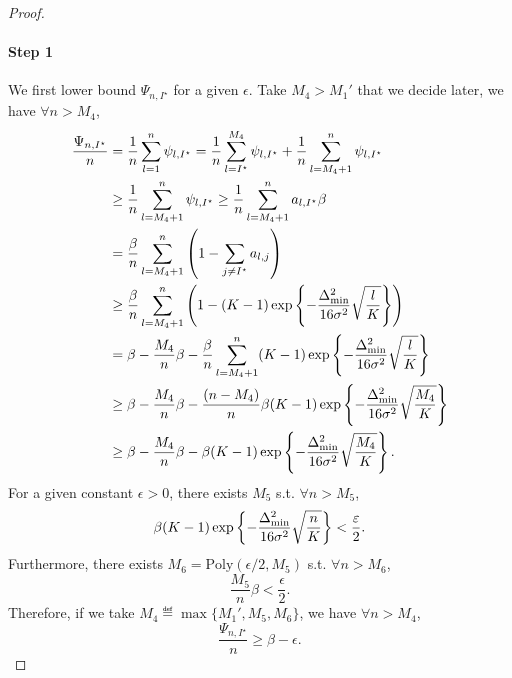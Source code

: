 \begin{proof}
    \paragraph{Step 1} We first lower bound $\Psi_{n,I^\star}$ for a given $\epsilon$. Take $M_4 > M_1'$ that we decide later, we have $\forall n > M_4$,
    \begin{align*}
        \frac{\Psi_{n,I^\star}}{n} &= \frac{1}{n}\sum_{l=1}^{n}\psi_{l,I^\star} = \frac{1}{n}\sum_{l=I^\star}^{M_4}\psi_{l,I^\star} + \frac{1}{n}\sum_{l=M_4+1}^{n}\psi_{l,I^\star}\\
                             &\geq \frac{1}{n}\sum_{l=M_4+1}^{n}\psi_{l,I^\star} \geq \frac{1}{n}\sum_{l=M_4+1}^{n} a_{l,I^\star}\beta\\
                             &= \frac{\beta}{n}\sum_{l=M_4+1}^{n} \left(1-\sum_{j\neq I^\star}a_{l,j}\right)\\
                             &\geq \frac{\beta}{n}\sum_{l=M_4+1}^{n} \left(1-(K-1)\exp\left\{-\frac{\Delta_{\text{min}}^2}{16\sigma^2}\sqrt{\frac{l}{K}}\right\}\right)\\
                             &= \beta - \frac{M_4}{n}\beta - \frac{\beta}{n}\sum_{l=M_4+1}^{n} (K-1)\exp\left\{-\frac{\Delta_{\text{min}}^2}{16\sigma^2}\sqrt{\frac{l}{K}}\right\}\\
                             &\geq \beta - \frac{M_4}{n}\beta - \frac{(n-M_4)}{n}\beta(K-1)\exp\left\{-\frac{\Delta_{\text{min}}^2}{16\sigma^2}\sqrt{\frac{M_4}{K}}\right\}\\
                             &\geq \beta - \frac{M_4}{n}\beta - \beta(K-1)\exp\left\{-\frac{\Delta_{\text{min}}^2}{16\sigma^2}\sqrt{\frac{M_4}{K}}\right\}.
    \end{align*}
    For a given constant $\epsilon>0$, there exists $M_5$ s.t. $\forall n > M_5$,
    \[
        \beta(K-1)\exp\left\{-\frac{\Delta_{\text{min}}^2}{16\sigma^2}\sqrt{\frac{n}{K}}\right\} < \frac{\varepsilon}{2}.
    \]
    Furthermore, there exists $M_6 = \text{Poly}(\epsilon/2,M_5)$ s.t. $\forall n > M_6$,
    \[
        \frac{M_5}{n}\beta < \frac{\epsilon}{2}.
    \]
    Therefore, if we take $M_4 \eqdef \max\{M_1', M_5, M_6\}$, we have $\forall n > M_4$,
    \[
        \frac{\Psi_{n,I^\star}}{n} \geq \beta - \epsilon.
    \]
    

\end{proof}

